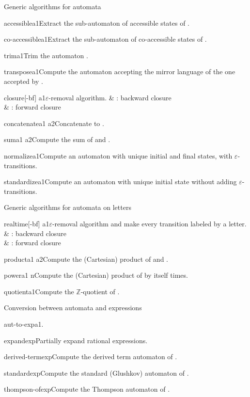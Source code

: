 \begin{fnsection}{Generic algorithms for automata}
\item{accessible}{a1}{Extract the sub-automaton of accessible states
    of .}
\item{co-accessible}{a1}{Extract the sub-automaton of co-accessible
    states of .}
\item{trim}{a1}{Trim the automaton .}
\item{transpose}{a1}{Compute the automaton accepting the mirror
    language of the one accepted by .}
\item{closure}{[-bf] a1}{$\varepsilon$-removal algorithm.}
  &  : backward closure\\
  &  : forward closure\\
\item{concatenate}{a1 a2}{Concatenate  to .}
\item{sum}{a1 a2}{Compute the sum of  and .}
\item{normalize}{a1}{Compute an automaton with unique initial and
    final states, with $\varepsilon$-transitions.}
\item{standardize}{a1}{Compute an automaton with unique initial state
    without adding $\varepsilon$-transitions.}  \hline
\end{fnsection}

\begin{fnsection}{Generic algorithms for automata on letters}
\item{realtime}{[-bf] a1}{$\varepsilon$-removal algorithm and make
    every transition labeled by a letter.}
  &  : backward closure\\
  &  : forward closure\\
\item{product}{a1 a2}{Compute the (Cartesian) product of  and
    .}
\item{power}{a1 n}{Compute the (Cartesian) product of  by
    itself  times.}
\item{quotient}{a1}{Compute the $\mathbb{Z}$-quotient of .}
  \hline
\end{fnsection}

\begin{fnsection}{Conversion between automata and expressions}
\item{aut-to-exp}{a1}{.}%
\item{expand}{exp}{Partially expand rational expressions.}
\item{derived-term}{exp}{Compute the derived term automaton of
    .}
\item{standard}{exp}{Compute the standard (Glushkov) automaton of
    .}
\item{thompson-of}{exp}{Compute the Thompson automaton of .}
  \hline
\end{fnsection}


